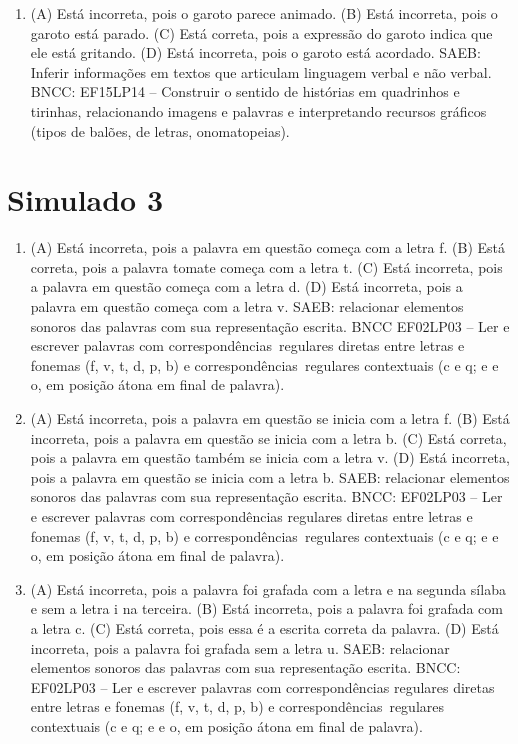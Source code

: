 \begin{enumerate}
\item
(A) Está incorreta, pois o garoto parece animado.
(B) Está incorreta, pois o garoto está parado.
(C) Está correta, pois a expressão do garoto indica que ele está gritando.
(D) Está incorreta, pois o garoto está acordado.
SAEB: Inferir informações em textos que articulam linguagem verbal e não verbal.
BNCC: EF15LP14 -- Construir o sentido de histórias em quadrinhos
e tirinhas, relacionando imagens e palavras e interpretando recursos
gráficos (tipos de balões, de letras, onomatopeias).
\end{enumerate}

\section*{Simulado 3}

\begin{enumerate}
\item
(A) Está incorreta, pois a palavra em questão começa com a letra f.
(B) Está correta, pois a palavra tomate começa com a letra t.
(C) Está incorreta, pois a palavra em questão começa com a letra d.
(D) Está incorreta, pois a palavra em questão começa com a letra v.
SAEB: relacionar elementos sonoros das palavras com sua representação escrita.
BNCC EF02LP03 -- Ler e escrever palavras com correspondências~regulares
diretas entre letras e fonemas (f, v, t, d, p, b) e correspondências~regulares contextuais (c e q; e e o, em posição átona em final de palavra).

\item
(A) Está incorreta, pois a palavra em questão se inicia com a letra f.
(B) Está incorreta, pois a palavra em questão se inicia com a letra b.
(C) Está correta, pois a palavra em questão também se inicia com a letra v.
(D) Está incorreta, pois a palavra em questão se inicia com a letra b.
SAEB: relacionar elementos sonoros das palavras com sua representação escrita.
BNCC: EF02LP03 -- Ler e escrever palavras com correspondências
regulares diretas entre letras e fonemas (f, v, t, d, p, b) e
correspondências~regulares contextuais (c e q; e e o, em posição átona
em final de palavra).

\item
(A) Está incorreta, pois a palavra foi grafada com a letra e na segunda sílaba e sem a letra i na terceira.
(B) Está incorreta, pois a palavra foi grafada com a letra c.
(C) Está correta, pois essa é a escrita correta da palavra.
(D) Está incorreta, pois a palavra foi grafada sem a letra u.
SAEB: relacionar elementos sonoros das palavras com sua representação escrita.
BNCC: EF02LP03 -- Ler e escrever palavras com correspondências
regulares diretas entre letras e fonemas (f, v, t, d, p, b) e
correspondências~regulares contextuais (c e q; e e o, em posição átona
em final de palavra).


\end{enumerate}
